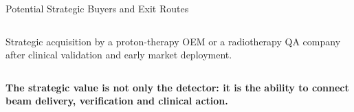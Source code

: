\documentclass[aspectratio=169,11pt]{beamer}
\begin{document}
\begin{frame}{Potential Strategic Buyers and Exit Routes}
\begin{columns}[T,onlytextwidth]
\vspace{0.10cm}

\tiny\color{black}

Strategic acquisition by a proton-therapy OEM or a radiotherapy
QA company after clinical validation and early market deployment.

\end{columns}

\vspace{0.30cm}

\begin{center}
\small\bfseries\color{darkred}
The strategic value is not only the detector:
it is the ability to connect beam delivery, verification and clinical action.
\end{center}

\end{frame}





\end{document}
